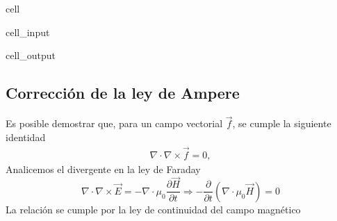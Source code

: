 \documentclass[letterpaper,10pt,english]{jupyterBook}
\begin{document}
\begin{sphinxuseclass}{cell}\begin{sphinxVerbatimInput}

\begin{sphinxuseclass}{cell_input}
\begin{sphinxVerbatim}[commandchars=\\\{\}]
   
     
\end{sphinxVerbatim}

\end{sphinxuseclass}\end{sphinxVerbatimInput}
\begin{sphinxVerbatimOutput}

\begin{sphinxuseclass}{cell_output}
\noindent{}

\end{sphinxuseclass}\end{sphinxVerbatimOutput}

\end{sphinxuseclass}

\subsection{Corrección de la ley de Ampere}
\label{\detokenize{1_ondas_electromagneticas/1_ondas_electromagneticas:correccion-de-la-ley-de-ampere}}
\sphinxAtStartPar
Es posible demostrar que, para un campo vectorial \(\vec{f}\), se cumple la siguiente identidad
\begin{equation*}
\begin{split}\nabla\cdot\nabla\times\vec{f} = 0,\end{split}
\end{equation*}
\sphinxAtStartPar
Analicemos el divergente en la ley de Faraday
\begin{equation*}
\nabla\cdot \nabla\times\vec{E} = -\nabla\cdot\mu_0\frac{\partial \vec{H}}{\partial t} \Rightarrow -\frac{\partial }{\partial t}\left(\nabla\cdot\mu_0\vec{H}\right) =0
\end{equation*}
\sphinxAtStartPar
La relación se cumple por la ley de continuidad del campo magnético
\end{document}
